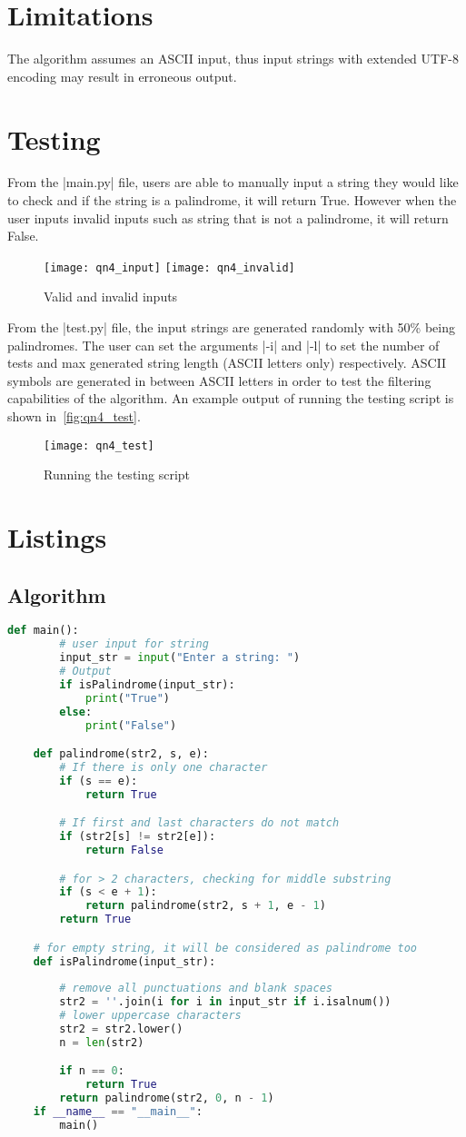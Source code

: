 \documentclass{report}
\begin{document}
\section{Limitations}
The algorithm assumes an ASCII input, thus input strings with extended UTF-8 encoding may result in erroneous output.
\section{Testing}
From the |main.py| file, users are able to manually input a string they would like to check and if the string is a palindrome, it will return True. However when the user inputs invalid inputs such as string that is not a palindrome, it will return False.
\begin{figure}[H]
	\centering
	\caption{Valid and invalid inputs}
	\texttt{[image: qn4\_input]}
	\texttt{[image: qn4\_invalid]}
	\label{fig:qn4_input}
\end{figure}
From the |test.py| file, the input strings are generated randomly with 50\% being palindromes. The user can set the arguments |-i| and |-l| to set the number of tests and max generated string length (ASCII letters only) respectively. ASCII symbols are generated in between ASCII letters in order to test the filtering capabilities of the algorithm. An example output of running the testing script is shown in~\autoref{fig:qn4_test}.
\begin{figure}[H]
	\centering
	\caption{Running the testing script}
	\texttt{[image: qn4\_test]}
	\label{fig:qn4_test}
\end{figure}

\section{Listings}
\subsection{Algorithm}
\begin{lstlisting}[language=python]
	def main():
		# user input for string
		input_str = input("Enter a string: ")
		# Output
		if isPalindrome(input_str):
			print("True")
		else:
			print("False")

	def palindrome(str2, s, e):
		# If there is only one character
		if (s == e):
			return True

		# If first and last characters do not match
		if (str2[s] != str2[e]):
			return False

		# for > 2 characters, checking for middle substring
		if (s < e + 1):
			return palindrome(str2, s + 1, e - 1)
		return True

	# for empty string, it will be considered as palindrome too
	def isPalindrome(input_str):
		
		# remove all punctuations and blank spaces
		str2 = ''.join(i for i in input_str if i.isalnum())
		# lower uppercase characters
		str2 = str2.lower()
		n = len(str2)

		if n == 0:
			return True
		return palindrome(str2, 0, n - 1)
	if __name__ == "__main__":
		main()
\end{lstlisting}
\end{document}
